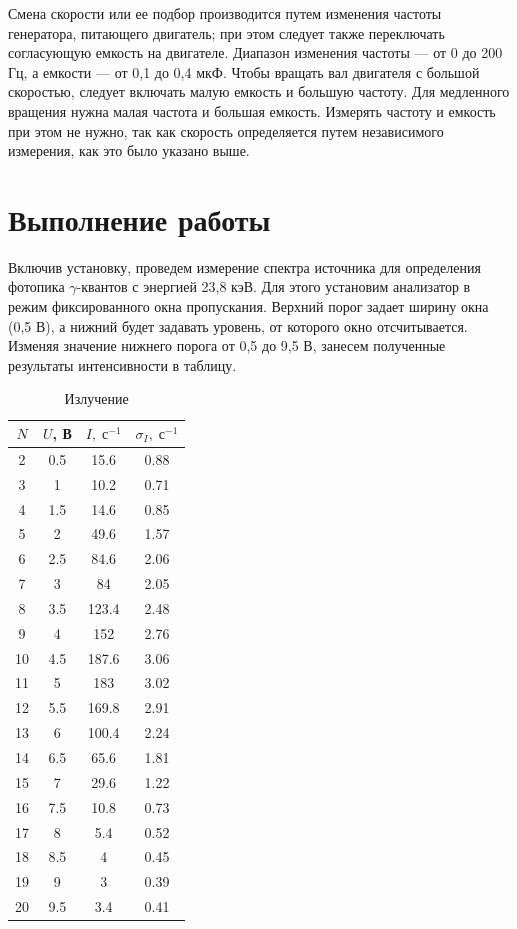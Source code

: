 \documentclass[12pt]{kiarticle}
\begin{document}
	Смена скорости или ее подбор производится путем изменения частоты генератора, питающего двигатель; при этом следует также переключать согласующую емкость на двигателе. Диапазон изменения
	частоты --- от 0 до 200 Гц, а емкости --- от 0,1 до 0,4 мкФ. Чтобы вращать вал двигателя с большой скоростью, следует включать малую
	емкость и большую частоту. Для медленного вращения нужна малая
	частота и большая емкость. Измерять частоту и емкость при этом не нужно, так как скорость определяется путем независимого измерения,
	как это было указано выше.

	
	\section{Выполнение работы}
	
	Включив установку, проведем измерение спектра источника для определения фотопика $ \gamma $-квантов с энергией 23,8 кэВ. Для этого установим анализатор в режим фиксированного окна пропускания. Верхний порог задает ширину окна (0,5 В), а нижний будет задавать уровень, от которого окно отсчитывается. Изменяя значение нижнего порога от 0,5 до 9,5 В, занесем полученные результаты интенсивности в таблицу. 
	
	 \begin{table}[h]
	 	\caption{Излучение}
	 	\begin{center}
	 		\begin{tabular}{|c|c|c|c|}
	 			\hline
	 			$ N  $ & $ U $, В &  $ I, \; с^{-1} $ & $ \sigma_I, \; с^{-1} $  \\
	 			\hline
	 			2 & 0.5 & 15.6 & 0.88 \\
	 			3 & 1 & 10.2 & 0.71 \\
	 			4 & 1.5 & 14.6 & 0.85 \\
	 			5 & 2 & 49.6 & 1.57 \\
	 			6 & 2.5 & 84.6 & 2.06 \\
	 			7 & 3 & 84 & 2.05 \\
	 			8 & 3.5 & 123.4 & 2.48 \\
	 			9 & 4 & 152 & 2.76 \\
	 			10 & 4.5 & 187.6 & 3.06 \\
	 			11 & 5 & 183 & 3.02 \\
	 			12 & 5.5 & 169.8 & 2.91 \\
	 			13 & 6 & 100.4 & 2.24 \\
	 			14 & 6.5 & 65.6 & 1.81 \\
	 			15 & 7 & 29.6 & 1.22 \\
	 			16 & 7.5 & 10.8 & 0.73 \\
	 			17 & 8 & 5.4 & 0.52 \\
	 			18 & 8.5 & 4 & 0.45 \\
	 			19 & 9 & 3 & 0.39 \\
	 			20 & 9.5 & 3.4 & 0.41 \\
	 			\hline
	 		\end{tabular}
	 	\end{center}
	 	\label{table_5}
	 \end{table}
	 
\end{document}
